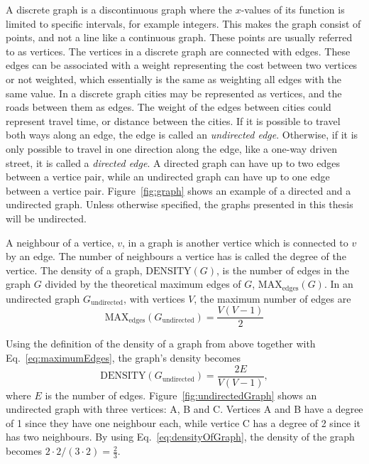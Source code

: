 A discrete graph is a discontinuous graph where the $x$-values of its function is limited to specific intervals, for example integers. This makes the graph consist of points, and not a line like a continuous graph. These points are usually referred to as vertices. The vertices in a discrete graph are connected with edges. These edges can be associated with a weight representing the cost between two vertices or not weighted, which essentially is the same as weighting all edges with the same value. In a discrete graph cities may be represented as vertices, and the roads between them as edges. The weight of the edges between cities could represent travel time, or distance between the cities. If it is possible to travel both ways along an edge, the edge is called an \textit{undirected edge}. Otherwise, if it is only possible to travel in one direction along the edge, like a one-way driven street, it is called a \textit{directed edge}. A directed graph can have up to two edges between a vertice pair, while an undirected graph can have up to one edge between a vertice pair. Figure~\ref{fig:graph} shows an example of a directed and a undirected graph. Unless otherwise specified, the graphs presented in this thesis will be undirected.

A neighbour of a vertice, $v$, in a graph is another vertice which is connected to $v$ by an edge. The number of neighbours a vertice has is called the degree of the vertice. The density of a graph, $\mathrm{DENSITY}(G)$, is the number of edges in the graph $G$ divided by the theoretical maximum edges of $G$, $\mathrm{MAX}_\mathrm{edges}(G)$. In an undirected graph $G_\mathrm{undirected}$, with vertices $V$, the maximum number of edges are
\begin{equation}\label{eq:maximumEdges}
\mathrm{MAX}_\mathrm{edges}(G_\mathrm{undirected}) = \frac{V  (V-1)}{2}
\end{equation}

Using the definition of the density of a graph from above together with Eq.~\eqref{eq:maximumEdges}, the graph's density becomes
\begin{equation}\label{eq:densityOfGraph}
\mathrm{DENSITY}(G_\mathrm{undirected}) = \frac{2 E}{V(V-1)},
\end{equation}
where $E$ is the number of edges. Figure~\ref{fig:undirectedGraph} shows an undirected graph with three vertices: A, B and C. Vertices A and B have a degree of 1 since they have one neighbour each, while vertice C has a degree of 2 since it has two neighbours. By using Eq.~\eqref{eq:densityOfGraph}, the density of the graph becomes $2\cdot2 / (3\cdot2) = \frac{2}{3}$.

